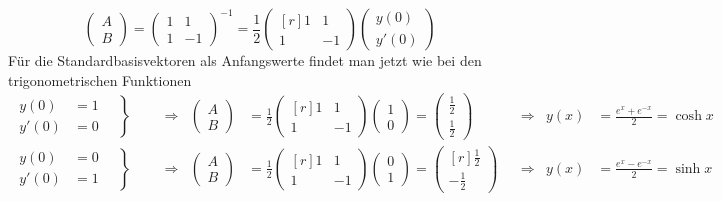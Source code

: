 \[
\begin{pmatrix}
A\\B
\end{pmatrix}
=
\begin{pmatrix}
  1     &    1    \\
  1     &   -1
\end{pmatrix}^{-1}
=
\frac12
\begin{pmatrix*}[r]
1&1\\
1&-1
\end{pmatrix*}
\begin{pmatrix}
 y(0)\\
y'(0)
\end{pmatrix}
\]
Für die Standardbasisvektoren als Anfangswerte findet man jetzt wie bei
den trigonometrischen Funktionen 
\begin{align*}
\left.
\begin{aligned}
 y(0)&=1\\
y'(0)&=0
\end{aligned}
\quad\right\}
&&&\Rightarrow&
\begin{pmatrix}A\\B\end{pmatrix}
&=
\frac12
\begin{pmatrix*}[r]
1&1\\
1&-1
\end{pmatrix*}
\begin{pmatrix}1\\0\end{pmatrix}
=
\begin{pmatrix}\frac12\\\frac12\end{pmatrix}
&&\Rightarrow&
y(x)&=\frac{e^x+e^{-x}}2=\cosh x
\\
\left.
\begin{aligned}
 y(0)&=0\\
y'(0)&=1
\end{aligned}
\quad\right\}
&&&\Rightarrow&
\begin{pmatrix}A\\B\end{pmatrix}
&=
\frac12
\begin{pmatrix*}[r]
1&1\\
1&-1
\end{pmatrix*}
\begin{pmatrix}0\\1\end{pmatrix}
=
\begin{pmatrix*}[r]\frac12\\-\frac12\end{pmatrix*}
&&\Rightarrow&
y(x)&=\frac{e^x-e^{-x}}2=\sinh x
\end{align*}

